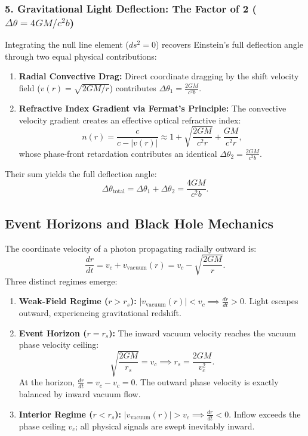 \subsubsection{5. Gravitational Light Deflection: The Factor of 2 ($\Delta\theta = 4GM/c^2 b$)}
Integrating the null line element ($ds^2 = 0$) recovers Einstein's full deflection angle through two equal physical contributions:
\begin{enumerate}
    \item \textbf{Radial Convective Drag:} Direct coordinate dragging by the shift velocity field ($v(r) = \sqrt{2GM/r}$) contributes $\Delta\theta_1 = \frac{2GM}{c^2 b}$.
    \item \textbf{Refractive Index Gradient via Fermat's Principle:} The convective velocity gradient creates an effective optical refractive index:
          \begin{equation}
              n(r) = \frac{c}{c - |v(r)|} \approx 1 + \sqrt{\frac{2GM}{c^2 r}} + \frac{GM}{c^2 r},
          \end{equation}
          whose phase-front retardation contributes an identical $\Delta\theta_2 = \frac{2GM}{c^2 b}$.
\end{enumerate}
Their sum yields the full deflection angle:
\begin{equation}
    \Delta\theta_{\mathrm{total}} = \Delta\theta_1 + \Delta\theta_2 = \frac{4GM}{c^2 b}.
    \label{eq:sapma_tam_ispat}
\end{equation}

\subsection{Event Horizons and Black Hole Mechanics}
The coordinate velocity of a photon propagating radially outward is:
\begin{equation}
    \frac{dr}{dt} = v_c + v_{\mathrm{vacuum}}(r) = v_c - \sqrt{\frac{2GM}{r}}.
    \label{eq:isik_kacis_hizi}
\end{equation}
Three distinct regimes emerge:
\begin{enumerate}
    \item \textbf{Weak-Field Regime ($r > r_s$):} $|v_{\mathrm{vacuum}}(r)| < v_c \implies \frac{dr}{dt} > 0$. Light escapes outward, experiencing gravitational redshift.
    \item \textbf{Event Horizon ($r = r_s$):} The inward vacuum velocity reaches the vacuum phase velocity ceiling:
          \begin{equation}
              \sqrt{\frac{2GM}{r_s}} = v_c \implies r_s = \frac{2GM}{v_c^2}.
              \label{eq:olay_ufku_turetme}
          \end{equation}
          At the horizon, $\frac{dr}{dt} = v_c - v_c = 0$. The outward phase velocity is exactly balanced by inward vacuum flow.
    \item \textbf{Interior Regime ($r < r_s$):} $|v_{\mathrm{vacuum}}(r)| > v_c \implies \frac{dr}{dt} < 0$. Inflow exceeds the phase ceiling $v_c$; all physical signals are swept inevitably inward.
\end{enumerate}

